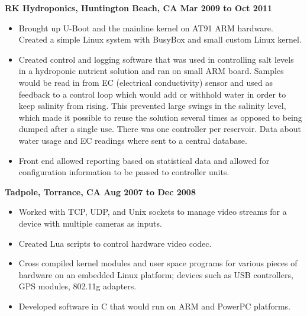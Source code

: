 \documentclass{res}
\begin{document}
\begin{resume}
\begin{itemize}
\end{itemize}

{\large \bf RK Hydroponics, Huntington Beach, CA \hfill Mar 2009 to
Oct 2011}

\begin{itemize}

\item
	Brought up U-Boot and the mainline kernel on AT91 ARM hardware.
	Created a simple Linux system with BusyBox and small custom
	Linux kernel.

\item
	Created control and logging software that was used in controlling
	salt levels in a hydroponic nutrient solution and ran on
	small ARM board.  Samples would be read in from EC (electrical
	conductivity) sensor and used as feedback to a control loop which
	would add or withhold water in order to keep salinity from rising.
	This prevented large swings in the salinity level, which made
	it possible to reuse the solution several times as opposed to
	being dumped after a single use.  There was one controller per
	reservoir.  Data about water usage and EC readings where sent
	to a central database.

\item
	Front end allowed reporting based on statistical data and allowed
	for configuration information to be passed to controller units.

\end{itemize}

{\large \bf Tadpole, Torrance, CA \hfill Aug 2007 to Dec 2008}

\begin{itemize}

\item
	Worked with TCP, UDP, and Unix sockets to manage video streams
	for a device with multiple cameras as inputs.

\item
	Created Lua scripts to control hardware video codec.

\item
	Cross compiled kernel modules and user space programs for various
	pieces of hardware on an embedded Linux platform; devices such
	as USB controllers, GPS modules, 802.11g adapters.

\item
	Developed software in C that would run on ARM and PowerPC platforms.

\end{itemize}


\end{resume}
\end{document}
